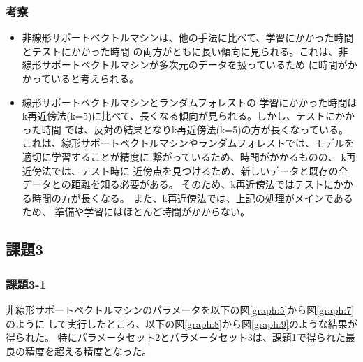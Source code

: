 \subsubsection{考察}
\begin{itemize}
  \item 非線形サポートベクトルマシンは、他の手法に比べて、学習にかかった時間とテストにかかった時間
  の両方がともに長い傾向に見られる。これは、非線形サポートベクトルマシンが多次元のデータを扱っているため
  に時間がかかっていると考えられる。
  \item 線形サポートベクトルマシンとランダムフォレストの
  学習にかかった時間はk再近傍法(k=5)に比べて、長くなる傾向が見られる。しかし、テストにかかった時間
  では、反対の結果となりk再近傍法(k=5)の方が長くなっている。
  これは、線形サポートベクトルマシンやランダムフォレストでは、モデルを適切に学習することが精度に
  繋がっているため、時間がかかるものの、
  k再近傍法では、テスト時に
  近傍点を見つけるため、新しいデータと既存の全データとの距離を知る必要がある。
  そのため、k再近傍法ではテストにかかる時間の方が長くなる。
  また、k再近傍法では、上記の処理がメインであるため、
  準備や学習にはほとんど時間がかからない。
\end{itemize}



\clearpage
\subsection{課題3}
\subsubsection{課題3-1}
非線形サポートベクトルマシンのパラメータを以下の図\ref{graph:5}から図\ref{graph:7}のように
して実行したところ、以下の図\ref{graph:8}から図\ref{graph:9}のような結果が得られた。
特にパラメータセット2とパラメータセット3は、課題1で得られた最良の精度を超える精度となった。

